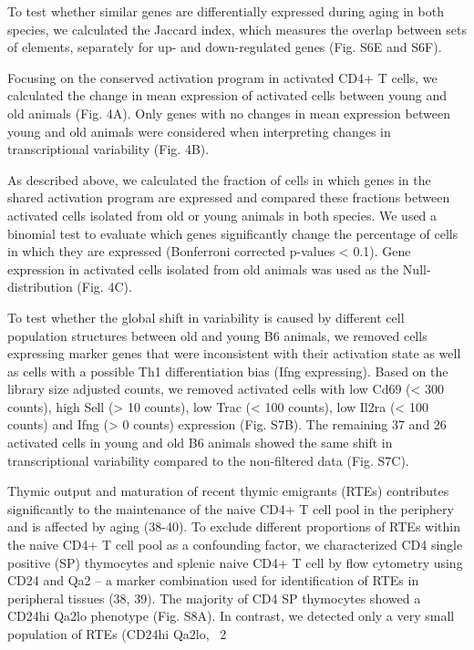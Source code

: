 To test whether similar genes are differentially expressed during aging in both species, we calculated the Jaccard index, which measures the overlap between sets of elements, separately for up- and down-regulated genes (Fig. S6E and S6F).

Focusing on the conserved activation program in activated CD4+ T cells, we calculated the change in mean expression of activated cells between young and old animals (Fig. 4A). Only genes with no changes in mean expression between young and old animals were considered when interpreting changes in transcriptional variability (Fig. 4B). 

As described above, we calculated the fraction of cells in which genes in the shared activation program are expressed and compared these fractions between activated cells isolated from old or young animals in both species. We used a binomial test to evaluate which genes significantly change the percentage of cells in which they are expressed (Bonferroni corrected p-values < 0.1). Gene expression in activated cells isolated from old animals was used as the Null-distribution (Fig. 4C). 

To test whether the global shift in variability is caused by different cell population structures between old and young B6 animals, we removed cells expressing marker genes that were inconsistent with their activation state as well as cells with a possible Th1 differentiation bias (Ifng expressing). Based on the library size adjusted counts, we removed activated cells with low Cd69 (< 300 counts), high Sell (> 10 counts), low Trac (< 100 counts), low Il2ra (< 100 counts) and Ifng (> 0 counts) expression (Fig. S7B). The remaining 37 and 26 activated cells in young and old B6 animals showed the same shift in transcriptional variability compared to the non-filtered data (Fig. S7C). 

Thymic output and maturation of recent thymic emigrants (RTEs) contributes significantly to the maintenance of the naive CD4+ T cell pool in the periphery and is affected by aging (38-40). To exclude different proportions of RTEs within the naive CD4+ T cell pool as a confounding factor, we characterized CD4 single positive (SP) thymocytes and splenic naive CD4+ T cell by flow cytometry using CD24 and Qa2 – a marker combination used for identification of RTEs in peripheral tissues (38, 39). The majority of CD4 SP thymocytes showed a CD24hi Qa2lo phenotype (Fig. S8A). In contrast, we detected only a very small population of RTEs (CD24hi Qa2lo, ~2%

